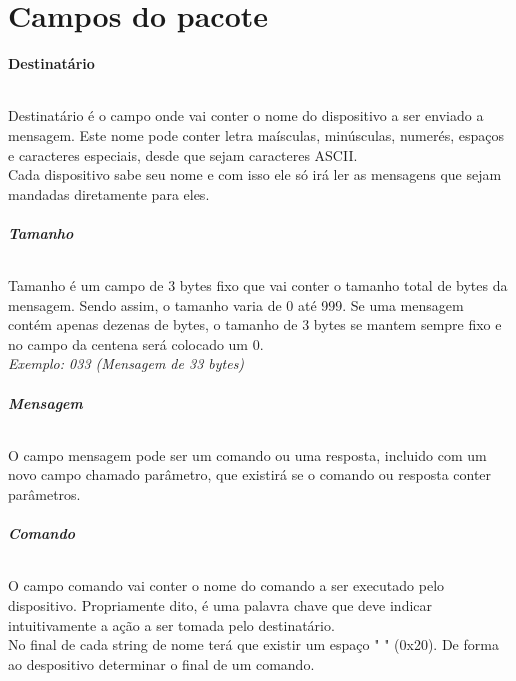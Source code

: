 \documentclass[11pt,	 papera4]{article}
\begin{document}
\newpage
\part*{Campos do pacote} 

\textbf{Destinatário}
\paragraph{}Destinatário é o campo onde vai conter o nome do dispositivo a ser enviado a mensagem.
Este nome pode conter letra maísculas, minúsculas, numerés, espaços e caracteres especiais, desde que sejam caracteres ASCII. \\
Cada dispositivo sabe seu nome e com isso ele só irá ler as mensagens que sejam mandadas diretamente para eles. \\




\paragraph{\textbf{Tamanho} \newline \newline} 

Tamanho é um campo de 3 bytes fixo que vai conter o tamanho total de bytes da mensagem. Sendo assim, o tamanho varia de 0 até 999.
Se uma mensagem contém apenas dezenas de bytes, o tamanho de 3 bytes se mantem sempre fixo e no campo da centena será colocado um 0.\\

\textsl{Exemplo: 033 (Mensagem de 33 bytes)} \\

\paragraph{\textbf{Mensagem} \newline \newline} 
O campo mensagem pode ser um comando ou uma resposta, incluido com um novo campo chamado parâmetro, que existirá se o comando ou resposta conter parâmetros.

\paragraph{\textbf{Comando} \newline \newline} 
O campo comando vai conter o nome do comando a ser executado pelo dispositivo. Propriamente dito, é uma palavra chave que deve indicar intuitivamente a ação a ser tomada pelo destinatário. \\
No final de cada string de nome terá que existir um espaço " " (0x20). De forma ao despositivo determinar o final de um comando. \\
\end{document}
